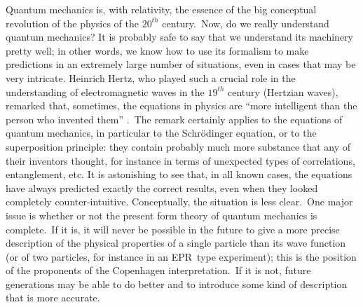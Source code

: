 \documentclass[12pt,onecolumn]{article}%
\begin{document}
Quantum mechanics is, with relativity, the essence of the big conceptual
revolution of the physics of the $20^{th}$ century.\ Now, do we really
understand quantum mechanics? It is probably safe to say that we understand
its machinery pretty well; in other words, we know how to use its formalism to
make predictions in an extremely large number of situations, even in cases
that may be very intricate. Heinrich Hertz, who played such a crucial role in
the understanding of electromagnetic waves in the $19^{th}$ century (Hertzian
waves), remarked that, sometimes, the equations in physics are ``more
intelligent than the person who invented them'' \cite{Hertz}.\ The remark
certainly applies to the equations of quantum mechanics, in particular to the
Schr\"{o}dinger equation, or to the superposition principle: they contain
probably much more substance that any of their inventors thought, for instance
in terms of unexpected types of correlations, entanglement, etc. It is
astonishing to see that, in all known cases, the equations have always
predicted exactly the correct results, even when they looked completely
counter-intuitive. Conceptually, the situation is less clear.\ One major issue
is whether or not the present form theory of quantum mechanics is
complete.\ If it is, it will never be possible in the future to give a more
precise description of the physical properties of a single particle than its
wave function (or of two particles, for instance in an EPR\ type experiment);
this is the position of the proponents of the Copenhagen interpretation.\ If
it is not, future generations may be able to do better and to introduce some
kind of description that is more accurate.
\end{document}
